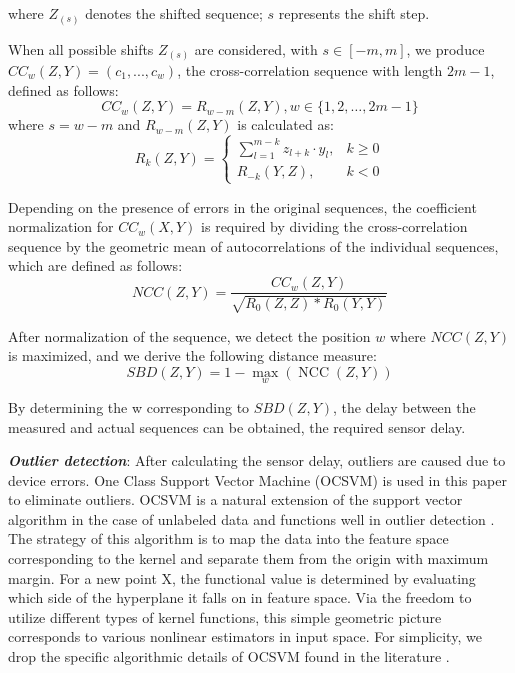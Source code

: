 \documentclass[journal]{IEEEtran}
\begin{document}
where $Z_{(s)}$ denotes the shifted sequence; $s$ represents the shift step.

When all possible shifts $Z_{(s)}$ are considered, with $s\in[-m, m]$, we produce $CC_w(Z,Y)= (c_1,..., c_w)$, the cross-correlation sequence with length $2m-1$, defined as follows:
\begin{equation}
  C C_{w}(Z, Y)=R_{w-m}(Z, Y), w \in\{1,2, \ldots, 2 m-1\}
  \label{Eq6}
\end{equation}
where $s=w-m$ and $R_{w-m}\left(Z,Y\right)$ is calculated as:
\begin{equation}
  R_{k}(Z, Y)= \begin{cases}\sum_{l=1}^{m-k} z_{l+k} \cdot y_{l}, & k \geq 0 \\ R_{-k}(Y, Z), & k<0\end{cases}
  \label{Eq7}
\end{equation}

Depending on the presence of errors in the original sequences, the coefficient normalization for $CC_w(X,Y)$ is required by dividing the cross-correlation sequence by the geometric mean of autocorrelations of the individual sequences, which are defined as follows:
\begin{equation}
  NCC(Z,Y)=\frac{CC_w(Z,Y)}{\sqrt{R_0\left(Z,Z\right)\ast R_0(Y,Y)}}
  \label{Eq8}
\end{equation}

After normalization of the sequence, we detect the position $w$ where $NCC(Z,Y)$ is maximized, and we derive the following distance measure:
\begin{equation}
  SBD(Z,Y)=1-\max _{w}\left(\operatorname{NCC}(Z, Y)\right)
  \label{Eq9}
\end{equation}

By determining the w corresponding to $SBD(Z, Y)$, the delay between the measured and actual sequences can be obtained, the required sensor delay.


\textbf{\emph{Outlier detection}}: After calculating the sensor delay, outliers are caused due to device errors. One Class Support Vector Machine (OCSVM) is used in this paper to eliminate outliers. OCSVM is a natural extension of the support vector algorithm in the case of unlabeled data and functions well in outlier detection \citep{Scholkopf1999}. The strategy of this algorithm is to map the data into the feature space corresponding to the kernel and separate them from the origin with maximum margin. For a new point X, the functional value is determined by evaluating which side of the hyperplane it falls on in feature space. Via the freedom to utilize different types of kernel functions, this simple geometric picture corresponds to various nonlinear estimators in input space. For simplicity, we drop the specific algorithmic details of OCSVM found in the literature \citep{Scholkopf2001,Scholkopf2002}.
\end{document}
